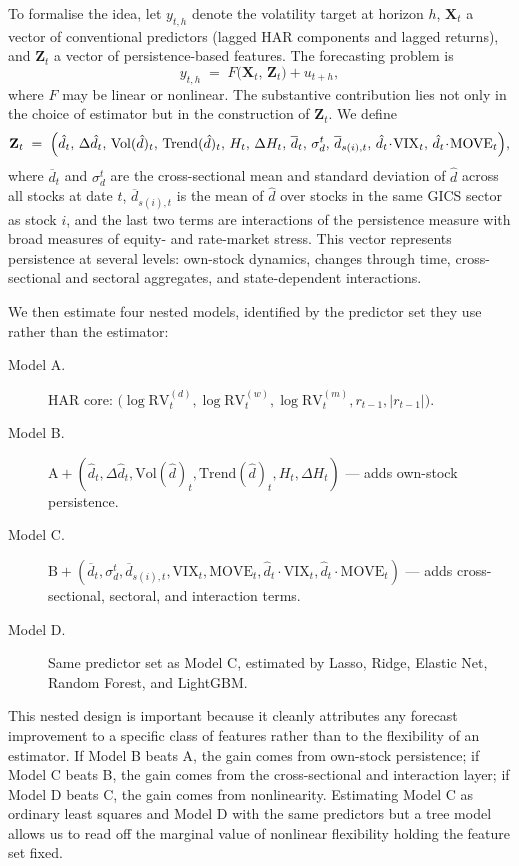 \documentclass[11pt,a4paper]{article}
\newcommand{\RV}{\mathrm{RV}}
\newcommand{\VIX}{\mathrm{VIX}}
\newcommand{\dhat}{\hat d}
\begin{document}
To formalise the idea, let $y_{t,h}$ denote the volatility target at
horizon $h$, $\mathbf X_t$ a vector of conventional predictors (lagged
HAR components and lagged returns), and $\mathbf Z_t$ a vector of
persistence-based features. The forecasting problem is
\begin{equation}
  y_{t,h} \;=\; F\!\bigl(\mathbf X_t,\, \mathbf Z_t\bigr) + u_{t+h},
\end{equation}
where $F$ may be linear or nonlinear. The substantive contribution lies
not only in the choice of estimator but in the construction of
$\mathbf Z_t$. We define
\begin{equation}
\mathbf Z_t \;=\; \Bigl(
  \dhat_t,\,\Delta\dhat_t,\,\mathrm{Vol}(\dhat)_t,\,\mathrm{Trend}(\dhat)_t,\,
  H_t,\,\Delta H_t,\,
  \overline{d}_t,\,\sigma_d^t,\,\overline{d}_{s(i),t},\,
  \dhat_t\!\cdot\!\VIX_t,\,\dhat_t\!\cdot\!\mathrm{MOVE}_t
\Bigr),
\end{equation}
where $\overline d_t$ and $\sigma_d^t$ are the cross-sectional mean and
standard deviation of $\dhat$ across all stocks at date $t$,
$\overline d_{s(i),t}$ is the mean of $\dhat$ over stocks in the same
GICS sector as stock $i$, and the last two terms are interactions of the
persistence measure with broad measures of equity- and rate-market
stress. This vector represents persistence at several levels: own-stock
dynamics, changes through time, cross-sectional and sectoral
aggregates, and state-dependent interactions.

We then estimate four nested models, identified by the predictor set
they use rather than the estimator:
\begin{description}
\item[Model A.] HAR core: $\bigl(\log\RV^{(d)}_t,\log\RV^{(w)}_t,
  \log\RV^{(m)}_t,r_{t-1},|r_{t-1}|\bigr)$.
\item[Model B.] $\text{A} + (\dhat_t,\Delta\dhat_t,
  \mathrm{Vol}(\dhat)_t,\mathrm{Trend}(\dhat)_t,H_t,\Delta H_t)$
  --- adds own-stock persistence.
\item[Model C.] $\text{B} + (\overline d_t,\sigma_d^t,
  \overline d_{s(i),t},\VIX_t,\mathrm{MOVE}_t,
  \dhat_t\!\cdot\!\VIX_t,\dhat_t\!\cdot\!\mathrm{MOVE}_t)$
  --- adds cross-sectional, sectoral, and interaction terms.
\item[Model D.] Same predictor set as Model C, estimated by Lasso, Ridge,
  Elastic Net, Random Forest, and LightGBM.
\end{description}

This nested design is important because it cleanly attributes any
forecast improvement to a specific class of features rather than to the
flexibility of an estimator. If Model B beats A, the gain comes from
own-stock persistence; if Model C beats B, the gain comes from the
cross-sectional and interaction layer; if Model D beats C, the gain
comes from nonlinearity. Estimating Model C as ordinary least squares and
Model D with the same predictors but a tree model allows us to read off
the marginal value of nonlinear flexibility holding the feature set
fixed.
\end{document}
